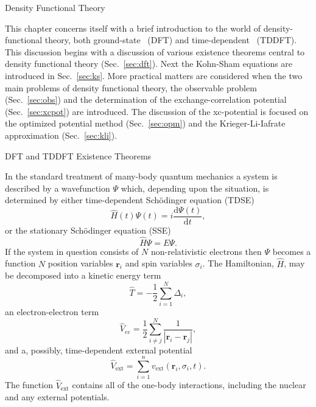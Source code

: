 \documentclass[letterpaper, 12 pt]{report}
\begin{document}
\begin{chapter}{Density Functional Theory \label{chap:dft}}

   This chapter concerns itself with a brief introduction to the world of density-functional theory,
   both ground-state~\cite{dft-engel} (DFT) and time-dependent~\cite{tddft, marques-1} (TDDFT). This
   discussion begins with a discussion of various existence theorems central to density functional
   theory (Sec.\ \ref{sec:dft}). Next the Kohn-Sham equations are introduced in Sec.\ \ref{sec:ks}.
   More practical matters are considered when the two main problems of density functional theory,
   the observable problem (Sec.\ \ref{sec:obs}) and the determination of the exchange-correlation
   potential (Sec.\ \ref{sec:xcpot}) are introduced. The discussion of the xc-potential is focused on
   the optimized potential method (Sec.\ \ref{sec:opm}) and the Krieger-Li-Iafrate approximation
   (Sec.\ \ref{sec:kli}).

   \begin{section}{DFT and TDDFT Existence Theorems \label{sec:dft}}

      In the standard treatment of many-body quantum mechanics a system is described by a wavefunction
      $\Psi$ which, depending upon the situation, is determined by either time-dependent Sch\"{o}dinger
      equation (TDSE)
      \begin{equation} \label{eq:tdse}
         \hat{H}(t) \Psi(t) = i \frac{\mathrm{d} \Psi(t)}{\mathrm{d} t},
      \end{equation}
      or the stationary Sch\"{o}dinger equation (SSE)
      \begin{equation} \label{eq:sse}
         \hat{H} \Psi = E \Psi.
      \end{equation}
      If the system in question consists of $N$ non-relativistic electrons then $\Psi$ becomes a
      function $N$ position variables $\mathbf{r}_i$ and spin variables $\sigma_i$. The Hamiltonian,
      $\hat{H}$, may be decomposed into a kinetic energy term
      \begin{equation} \label{eq:Top} %
         \hat{T} = -\frac{1}{2} \sum\limits^{N}_{i=1} \Delta_i,
      \end{equation}
      an electron-electron term
      \begin{equation} \label{eq:Vee} %
         \hat{V}_{ee} = \frac{1}{2} \sum\limits^{N}_{i \neq j}
                        \frac{1}{\left| \mathbf{r}_i - \mathbf{r}_j \right|},
      \end{equation}
      and a, possibly, time-dependent external potential
      \begin{equation} \label{eq:Vext}
         \hat{V}_\mathrm{ext} = \sum\limits^{n}_{i = 1} v_\mathrm{ext} (\mathbf{r}_i, \sigma_i, t).
      \end{equation}
      The function $\hat{V}_\mathrm{ext}$ contains all of the one-body interactions, including the
      nuclear and any external potentials.


\end{section}
\end{chapter}
\end{document}
